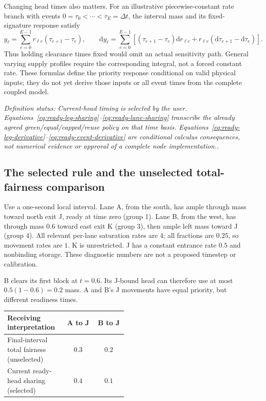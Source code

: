 \documentclass[11pt]{article}
\newcommand{\dd}{\mathrm d}
\newcommand{\status}[1]{\textit{Definition status: #1.}}
\begin{document}
Changing head times also matters. For an illustrative piecewise-constant rate branch with events $0=\tau_0<\cdots<\tau_E=\Delta t$, the interval mass and its fixed-signature response satisfy
\begin{equation}
 y_\ell=\sum_{e=0}^{E-1}r_{\ell e}(\tau_{e+1}-\tau_e),\qquad
 \dd y_\ell=\sum_{e=0}^{E-1}
 \left[(\tau_{e+1}-\tau_e)\dd r_{\ell e}
 +r_{\ell e}(\dd\tau_{e+1}-\dd\tau_e)\right].
 \label{eq:ready-event-derivative}
\end{equation}
Thus holding clearance times fixed would omit an actual sensitivity path. General varying supply profiles require the corresponding integral, not a forced constant rate. These formulas define the priority response conditional on valid physical inputs; they do not yet derive those inputs or all event times from the complete coupled model.

\status{Current-head timing is selected by the user. Equations~\eqref{eq:ready-leg-sharing}--\eqref{eq:ready-lane-sharing} transcribe the already agreed green/equal/capped/reuse policy on that time basis. Equations~\eqref{eq:ready-leg-derivative}--\eqref{eq:ready-event-derivative} are conditional calculus consequences, not numerical evidence or approval of a complete node implementation.}

\subsection*{The selected rule and the unselected total-fairness comparison}

Use a one-second local interval. Lane A, from the south, has ample through mass toward north exit J, ready at time zero (group 1). Lane B, from the west, has through mass $0.6$ toward east exit K (group 3), then ample left mass toward J (group 4). All relevant per-lane saturation rates are $4$; all fractions are $0.25$, so movement rates are $1$. K is unrestricted. J has a constant entrance rate $0.5$ and nonbinding storage. These diagnostic numbers are not a proposed timestep or calibration.

B clears its first block at $t=0.6$. Its J-bound head can therefore use at most $0.5(1-0.6)=0.2$ mass. A and B's J movements have equal priority, but different readiness times.

\begin{center}
\begin{tabular}{p{0.49\linewidth}cc}
\toprule
Receiving interpretation & A to J & B to J\\
\midrule
Final-interval total fairness (unselected) & $0.3$ & $0.2$\\
Current ready-head sharing (selected) & $0.4$ & $0.1$\\
\bottomrule
\end{tabular}
\end{center}
\end{document}
